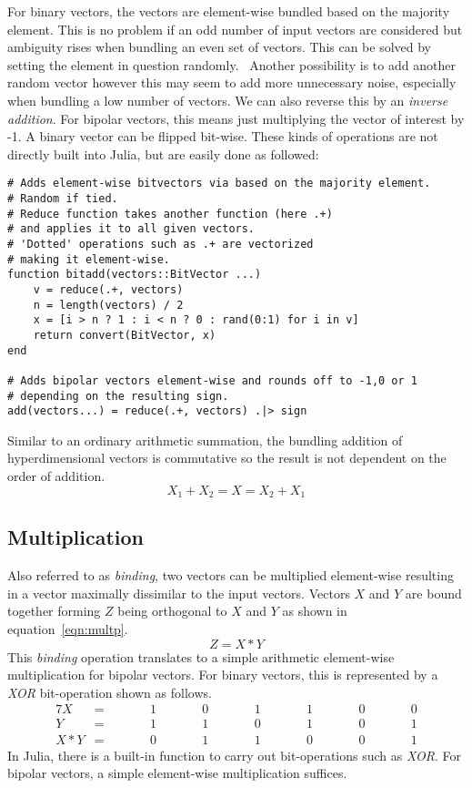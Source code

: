 For binary vectors, the vectors are element-wise bundled based on the majority element. This is no problem if an odd number of input vectors are considered but ambiguity rises when bundling an even set of vectors. This can be solved by setting the element in question randomly.~\cite{binBund} Another possibility is to add another random vector however this may seem to add more unnecessary noise, especially when bundling a low number of vectors. We can also reverse this by an \textit{inverse addition}. For bipolar vectors, this means just multiplying the vector of interest by -1. A binary vector can be flipped bit-wise. These kinds of operations are not directly built into Julia, but are easily done as followed:

\begin{verbatim}
# Adds element-wise bitvectors via based on the majority element.
# Random if tied.
# Reduce function takes another function (here .+)
# and applies it to all given vectors.
# 'Dotted' operations such as .+ are vectorized
# making it element-wise.
function bitadd(vectors::BitVector ...)
    v = reduce(.+, vectors)            
    n = length(vectors) / 2
    x = [i > n ? 1 : i < n ? 0 : rand(0:1) for i in v]
    return convert(BitVector, x)
end

# Adds bipolar vectors element-wise and rounds off to -1,0 or 1
# depending on the resulting sign.
add(vectors...) = reduce(.+, vectors) .|> sign
\end{verbatim}
Similar to an ordinary arithmetic summation, the bundling addition of hyperdimensional vectors is commutative so the result is not dependent on the order of addition.
\begin{equation}
    \label{eqn:sumcom}
    X_{1} + X_{2} = X = X_{2} + X_{1}
\end{equation}
\subsection*{Multiplication} \label{sssec:mult}
Also referred to as \textit{binding}, two vectors can be multiplied element-wise resulting in a vector maximally dissimilar to the input vectors. Vectors $X$ and $Y$ are bound together forming $Z$ being orthogonal to $X$ and $Y$ as shown in equation~\ref{eqn:multp}.
\begin{equation}
    \label{eqn:multp}
    Z = X * Y
\end{equation}
This \textit{binding} operation translates to a simple arithmetic element-wise multiplication for bipolar vectors. For binary vectors, this is represented by a \textit{XOR} bit-operation shown as follows.
\begin{alignat*}{7}
    X &= && \qquad 1 && \qquad 0 && \qquad 1 && \qquad 1 && \qquad 0 && \qquad 0 \\
    Y &= && \qquad 1 && \qquad 1 && \qquad 0 && \qquad 1 && \qquad 0 && \qquad 1 \\
    \hline
    X * Y &= && \qquad 0 && \qquad 1 && \qquad 1 &&  \qquad 0 && \qquad 0 && \qquad 1
\end{alignat*}
In Julia, there is a built-in function to carry out bit-operations such as \textit{XOR}. For bipolar vectors, a simple element-wise multiplication suffices.

